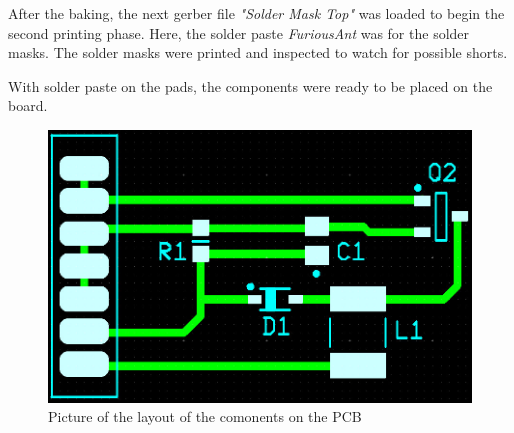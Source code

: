 After the baking, the next gerber file \textit{"Solder Mask Top"} was loaded to begin the second printing phase. Here, the solder paste \textit{FuriousAnt} was for the solder masks. The solder masks were printed and inspected to watch for possible shorts.

With solder paste on the pads, the components were ready to be placed on the board.
\begin{figure}[h]
    \includegraphics[width=\linewidth]{PCBlayout.jpg}
    \caption{Picture of the layout of the comonents on the PCB}
    \label{fig:PCB}
\end{figure}
